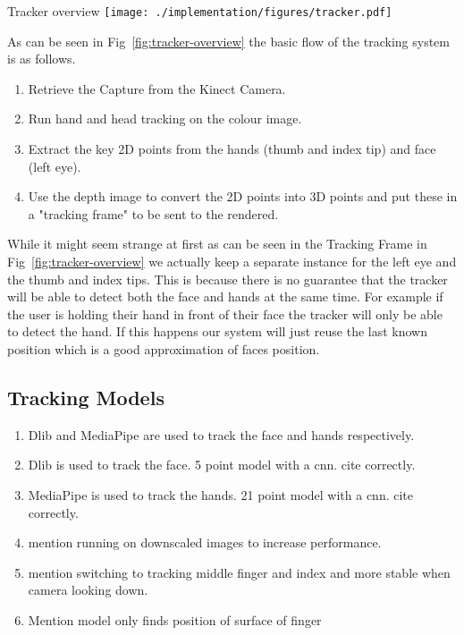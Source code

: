 \begin{figureBox}[label={fig:tracker-overview}, width=0.8\linewidth]{Tracker overview}
    \texttt{[image: ./implementation/figures/tracker.pdf]}
\end{figureBox}

As can be seen in Fig~\ref{fig:tracker-overview} the basic flow of the tracking system is as follows.
\begin{enumerate}[itemsep=-0.25em]
	\item Retrieve the Capture from the Kinect Camera.
	\item Run hand and head tracking on the colour image.
	\item Extract the key 2D points from the hands (thumb and index tip) and face (left eye).
	\item Use the depth image to convert the 2D points into 3D points and put these in a "tracking frame" to be sent to the rendered.
\end{enumerate}

While it might seem strange at first as can be seen in the Tracking Frame in Fig~\ref{fig:tracker-overview} we actually keep a separate instance for the left eye and the thumb and index tips. This is because there is no guarantee that the tracker will be able to detect both the face and hands at the same time. For example if the user is holding their hand in front of their face the tracker will only be able to detect the hand. If this happens our system will just reuse the last known position which is a good approximation of faces position. 

\subsection{Tracking Models}
\begin{enumerate}
	\item Dlib and MediaPipe are used to track the face and hands respectively.
	\item Dlib is used to track the face. 5 point model with a cnn. cite correctly.
	\item MediaPipe is used to track the hands. 21 point model with a cnn. cite correctly.
	\item mention running on downscaled images to increase performance.
	\item mention switching to tracking middle finger and index and more stable when camera looking down.
	\item Mention model only finds position of surface of finger
\end{enumerate}



